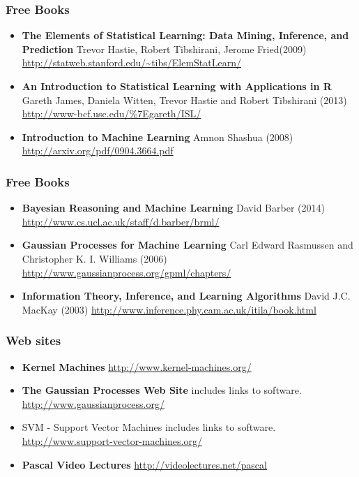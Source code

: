 \begin{frame}
\frametitle{Free Books}
\begin{itemize}
\item {\bf The Elements of Statistical Learning: Data Mining, Inference, and Prediction}
      Trevor Hastie, Robert Tibshirani, Jerome Fried(2009)
      \url{http://statweb.stanford.edu/~tibs/ElemStatLearn/}
\item {\bf An Introduction to Statistical Learning with Applications in R}
      Gareth James, Daniela Witten, Trevor Hastie and Robert Tibshirani (2013)
      \url{http://www-bcf.usc.edu/\%7Egareth/ISL/}
\item {\bf Introduction to Machine Learning}
      Amnon Shashua (2008)
      \url{http://arxiv.org/pdf/0904.3664.pdf}
\end{itemize}
\end{frame}

\begin{frame}
\frametitle{Free Books}
\begin{itemize}
\item {\bf Bayesian Reasoning and Machine Learning}
      David Barber (2014)
      \url{http://www.cs.ucl.ac.uk/staff/d.barber/brml/}
\item {\bf Gaussian Processes for Machine Learning}
      Carl Edward Rasmussen and Christopher K. I. Williams (2006)
      \url{http://www.gaussianprocess.org/gpml/chapters/}
\item {\bf Information Theory, Inference, and Learning Algorithms}
      David J.C. MacKay (2003)
      \url{http://www.inference.phy.cam.ac.uk/itila/book.html}
\end{itemize}
\end{frame}

\begin{frame}
\frametitle{Web sites}
\begin{itemize}
\item {\bf Kernel Machines} \url{http://www.kernel-machines.org/}
\item {\bf The Gaussian Processes Web Site} includes links to software. \url{http://www.gaussianprocess.org/}
\item{SVM - Support Vector Machines} includes links to software. \url{http://www.support-vector-machines.org/}
\item {\bf Pascal Video Lectures}  \url{http://videolectures.net/pascal}
\end{itemize}
\end{frame}

